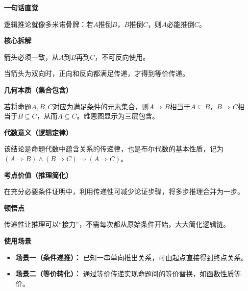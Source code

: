 \begin{explanationbox}
	\textbf{\textcolor{CExplanation}{一句话直觉}}

	逻辑推论就像多米诺骨牌：若$A$推倒$B$，$B$推倒$C$，则$A$必能推倒$C$。

	\medskip
	\textbf{\textcolor{CExplanation}{核心拆解}}
	\begin{description}[style=nextline, leftmargin=2.8em, labelsep=0.5em, itemsep=0.45em]
		\item[\textbf{要点一（传递方向）：}] 箭头必须一致，从$A$到$B$再到$C$，不可反向使用。
		\item[\textbf{要点二（等价特例）：}] 当箭头为双向时，正向和反向都满足传递，才得到等价传递。
	\end{description}

	\medskip
	\textbf{\textcolor{CExplanation}{几何本质（集合包含）}}

	若将命题$A,B,C$对应为满足条件的元素集合，则$A\Rightarrow B$相当于$A\subseteq B$，$B\Rightarrow C$相当于$B\subseteq C$，从而$A\subseteq C$。维恩图显示为三层包含。

	\medskip
	\textbf{\textcolor{CExplanation}{代数意义（逻辑定律）}}

	该结论是命题代数中蕴含关系的传递律，也是布尔代数的基本性质，记为$(A\Rightarrow B)\land(B\Rightarrow C)\Rightarrow(A\Rightarrow C)$。

	\medskip
	\textbf{\textcolor{CExplanation}{考点价值（推理简化）}}

	在充分必要条件证明中，利用传递性可减少论证步骤，将多步推理合并为一步。

	\medskip
	\textbf{\textcolor{CExplanation}{顿悟点}}

	传递性让推理可以“接力”，不需每次都从原始条件开始，大大简化逻辑链。

	\medskip
	\textbf{\textcolor{CExplanation}{使用场景}}
	\begin{itemize}[leftmargin=*, itemsep=0.5em, topsep=0.4em]
		\item \textbf{场景一（条件递推）：} 已知一串单向推出关系，可由起点直接得到终点关系。
		\item \textbf{场景二（等价转化）：} 通过等价传递实现命题间的等价替换，如函数性质等价。
	\end{itemize}
\end{explanationbox}
